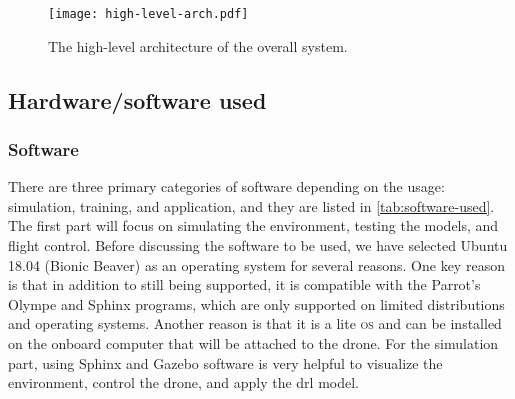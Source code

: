 \documentclass[../main.tex]{subfiles}
\begin{document}
\begin{figure}[h]
    \centering
    \texttt{[image: high-level-arch.pdf]}
    \caption{The high-level architecture of the overall system.}
    \label{fig:arch-fig}
\end{figure}

\subsection{Hardware/software used}

\subsubsection{Software}

There are three primary categories of software 
depending on the usage: simulation, training, 
and application, and they are listed in \cref{tab:software-used}. The first part will focus on 
simulating the environment, testing the models, 
and flight control. Before discussing the software 
to be used, we have selected Ubuntu 18.04 (Bionic Beaver) 
as an operating system for several reasons. 
One key reason is that in addition to
still being supported, it is compatible with the 
Parrot's Olympe and Sphinx programs, which are only 
supported on limited distributions and operating systems.
Another reason is that it is a lite \textsc{os} 
and can be installed on the onboard computer that 
will be attached to the drone. For the simulation part, 
using Sphinx and Gazebo software is very helpful
to visualize the environment, control the drone, 
and apply the \gls{drl} model. 
\end{document}
